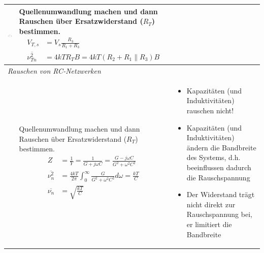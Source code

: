 \begin{longtable}[t]{|p{4cm}|p{6.5cm}|p{7cm}|}
    \includegraphics[width=4cm]{pictures/seriewiderstand2.png}
    & {Quellenumwandlung machen und dann Rauschen über Ersatzwiderstand ($R_T$) bestimmen.\newline
       \begin{align*}
           V_{T,s}&=V_{s}\frac{R_{3}}{R_{1}+R_{3}}\\
           \overline{\nu^2_{Tn}}&=4kTR_{T}B=4kT(R_{2}+R_{1}\parallel R_{3})B
       \end{align*}
      }
    & {
      }
    \\ \hline
    \multicolumn{3}{|l|}{\textit{Rauschen von RC-Netzwerken}}
    \\ \hdashline
    \begin{center}  \end{center}
    & {Quellenumwandlung machen und dann Rauschen über Ersatzwiderstand ($R_T$) bestimmen.\newline
        \begin{align*}
            Z &=\frac{1}{Y}=\frac{1}{G+j\omega C}=\frac{G-j\omega C}{G^2+\omega^2C^2}\\
            \overline{\nu^2_{n}} &=\frac{4kT}{2\pi}\int^{\infty}_{0}\frac{G}{G^2+\omega^2C^2}d\omega=\frac{kT}{C}\\
            \overline{\nu_{n}} &=\sqrt{\frac{kT}{C}}
        \end{align*}
      }
    & {\vspace{-1.5\topsep}
        \begin{itemize}[leftmargin=*]
            \item Kapazitäten (und Induktivitäten) rauschen nicht!
            \item Kapazitäten (und Induktivitäten) ändern die Bandbreite des Systems, d.h. beeinflussen dadurch die Rauschspannung
            \item Der Widerstand trägt nicht direkt zur Rauschspannung bei, er limitiert die Bandbreite
        \end{itemize}
      }
    \\ \hline
\end{longtable}

